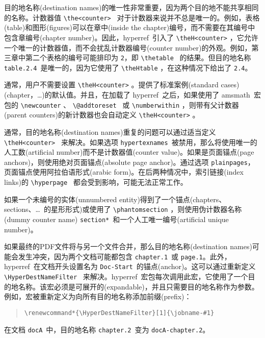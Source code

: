\documentclass{article}
\newcommand*{\cs}[1]{%
  \texttt{\textbackslash #1}%
}
\newcommand*{\xpackage}[1]{\textsf{#1}}
\begin{document}
目的地名称(destination names)的唯一性非常重要，因为两个目的地不能共享相同的名称。计数器值 \cs{the<counter>}\ 对于计数器来说并不总是唯一的。例如，表格(table)和图形(figures)可以在章中(inside the chapter)编号，而不需要在其编号中包含章编号(chapter number)。因此，\xpackage{hyperref}\ 引入了 \cs{theH<counter>}，它允许一个唯一的计数器值，而不会扰乱计数器编号(counter number)的外观。例如，第三章中第二个表格的编号可能排印为 \texttt{2}，即 \cs{thetable}\ 的结果。但目的地名称 \texttt{table.2.4}\ 是唯一的，因为它使用了 \cs{theHtable}，在这种情况下给出了 \verb|2.4|。

通常，用户不需要设置 \cs{theH<counter>}。提供了标准案例(standard cases)(chapter，\dots)的默认值。并且，在加载了 \xpackage{hyperref}\ 之后，如果使用了 \xpackage{amsmath}\ 宏包的 \cs{newcounter}、\cs{@addtoreset}\ 或 \cs{numberwithin}，则带有父计数器(parent counters)的新计数器也会自动定义 \cs{theH<counter>}。

通常，目的地名称(destination names)重复的问题可以通过适当定义 \cs{theH<counter>}\ 来解决。如果选项 \texttt{hypertexnames}\ 被禁用，那么将使用唯一的人工数(artificial number)而不是计数器值(counter value)。如果是页面锚点(page anchors)，则使用绝对页面锚点(absolute page anchor)。通过选项 \texttt{plainpages}，页面锚点使用阿拉伯语形式(arabic form)。在后两种情况中，索引链接(index links)的 \cs{hyperpage}\ 都会受到影响，可能无法正常工作。

如果一个未编号的实体(unnumbered entity)得到了一个锚点(chapters、sections、\dots~的星形形式)或使用了 \cs{phantomsection}，则使用伪计数器名称(dummy counter name) \texttt{section*}\ 和一个人工唯一编号(artificial unique number)。

如果最终的PDF文件将与另一个文件合并，那么目的地名称(destination names)可能会发生冲突，因为两个文档可能都包含 \texttt{chapter.1}\ 或 \texttt{page.1}。此外，\xpackage{hyperref}\ 在文档开头设置名为 \texttt{Doc-Start}\ 的锚点(anchor)。这可以通过重新定义 \cs{HyperDestNameFilter}\ 来解决。\xpackage{hyperref}\ 宏包每次调用此宏，它使用了一个目的地名称。该宏必须是可展开的(expandable)，并且只需要目的地名称作为参数。例如，宏被重新定义为向所有目的地名称添加前缀(prefix)：
\begin{quote}
\begin{verbatim}
\renewcommand*{\HyperDestNameFilter}[1]{\jobname-#1}
\end{verbatim}
\end{quote}
在文档 \texttt{docA}\ 中，目的地名称 \texttt{chapter.2}\ 变为 \texttt{docA-chapter.2}。
\end{document}
